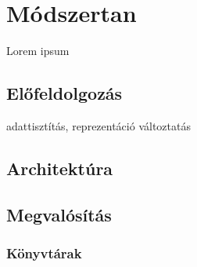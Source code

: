 \chapter{Módszertan} 
\label{ch:methodology}

Lorem ipsum

\section{Előfeldolgozás}

adattisztítás, reprezentáció változtatás

\section{Architektúra}


\section{Megvalósítás}

\subsection{Könyvtárak}

